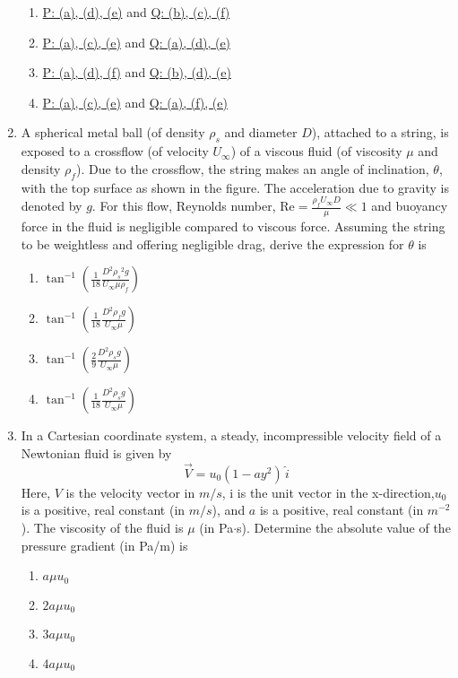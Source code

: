 \documentclass[journal,12pt,onecolumn]{IEEEtran}
\theoremstyle{remark}
\begin{document}
\begin{enumerate}
\begin{enumerate}
        \item \underline{P: (a), (d), (e)} and \underline{Q: (b), (c), (f)}
        \item \underline{P: (a), (c), (e)} and \underline{Q: (a), (d), (e)}
        \item \underline{P: (a), (d), (f)} and \underline{Q: (b), (d), (e)}
        \item \underline{P: (a), (c), (e)} and \underline{Q: (a), (f), (e)}
            \end{enumerate}

    \item A spherical metal ball (of density $\rho_s$ and diameter $D$), attached to a string, is exposed to a crossflow (of velocity $U_{\infty}$) of a viscous fluid (of viscosity $\mu$ and density $\rho_f$). Due to the crossflow, the string makes an angle of inclination, $\theta$, with the top surface as shown in the figure. The acceleration due to gravity is denoted by $g$. For this flow, Reynolds number, $\text{Re}=\frac{{\rho_f}U_{\infty}D}{\mu} \ll 1$ and buoyancy force in the fluid is negligible compared to viscous force. Assuming the string to be weightless and offering negligible drag, derive the expression for $\theta$ is 
    \begin{figure}[H]
        \centering
          
    \end{figure}
    \begin{enumerate}
        \item $\tan^{-1}({\frac{1}{18}}{\frac{D^2{\rho_s}^2{g}}{U_{\infty} \mu \rho_f}}) $
        \item $\tan^{-1}({\frac{1}{18}}{\frac{D^2{\rho_f}{g}}{U_{\infty} \mu}})$
        \item $\tan^{-1}({\frac{2}{9}}{\frac{D^2{\rho_s}{g}}{U_{\infty} \mu}})$
        \item $\tan^{-1}({\frac{1}{18}}{\frac{D^2{\rho_s}{g}}{U_{\infty} \mu}})$
    \end{enumerate}

    \item In a Cartesian coordinate system, a steady, incompressible velocity field of a Newtonian fluid is given by 
    $$\vec{V} = u_0(1 - ay^2) \, \hat{i}$$
    Here, $V$ is the velocity vector in $m/s$, i is the unit vector in the x-direction,$u_0$ is a positive, real constant (in $m/s$), and $a$ is a positive, real constant (in $m^{-2}$). The viscosity of the fluid is $\mu$ (in Pa$\cdot$s). Determine the absolute value of the pressure gradient (in Pa/m) is 
    \begin{enumerate}
        \item $a \mu u_0$
        \item $2a \mu u_0$
        \item $3a \mu u_0$
        \item $4a \mu u_0$


\end{enumerate}
\end{enumerate}
\end{document}
